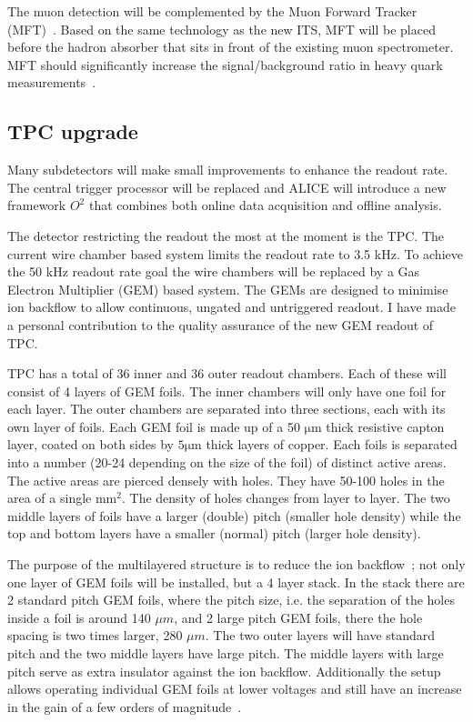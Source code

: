 \setlength{\emergencystretch}{3em}

The muon detection will be complemented by the Muon Forward Tracker (MFT)~\cite{CERN-LHCC-2015-001}. Based on the same technology as the new ITS, MFT will be placed before the hadron absorber that sits in front of the existing muon spectrometer. MFT should significantly increase the signal/background ratio in heavy quark measurements~\cite{CERN-LHCC-2015-001}.

\subsection{TPC upgrade}
Many subdetectors will make small improvements to enhance the readout rate. The central trigger processor will be replaced and ALICE will introduce a new framework $O^2$ that combines both online data acquisition and offline analysis.

The detector restricting the readout the most at the moment is the TPC. The current wire chamber based system  limits the readout rate to 3.5 kHz. To achieve the 50 kHz readout rate goal the wire chambers will be replaced by a Gas Electron Multiplier (GEM) based system. The GEMs are designed to minimise ion backflow to allow continuous, ungated and untriggered readout. I have made a personal contribution to the quality assurance of the new GEM readout of TPC.

TPC has a total of 36 inner and 36 outer readout chambers. Each of these will consist of 4 layers of GEM foils. The inner chambers will only have one foil for each layer. The outer chambers are separated into three sections, each with its own layer of foils. Each GEM foil is made up of a 50 $\mathrm{\mu m}$ thick resistive capton layer, coated on both sides by $5 \mathrm{\mu m}$ thick layers of copper. Each foils is separated into a number (20-24 depending on the size of the foil) of distinct active areas. The active areas are pierced densely with holes. They have 50-100 holes in the area of a single $\mathrm{mm^2}$. The density of holes changes from layer to layer. The two middle layers of foils have a larger (double) pitch (smaller hole density) while the top and bottom layers have a smaller (normal) pitch (larger hole density).

The purpose of the multilayered structure is to reduce the ion backflow~\cite{Sauli:2005zx,Ball:2014qaa}; not only one layer of GEM foils will be installed, but a 4 layer stack. In the stack there are 2 standard pitch GEM foils, where the pitch size, i.e. the separation of the holes inside a foil is around 140 $\mu m$, and 2 large pitch GEM foils, there the hole spacing is two times larger, 280 $\mu m$. The two outer layers will have standard pitch and the two middle layers have large pitch. The middle layers with large pitch serve as extra insulator against the ion backflow. Additionally the setup allows operating individual GEM foils at lower voltages and still have an increase in the gain of a few orders of magnitude~\cite{TPCupgrade}.

